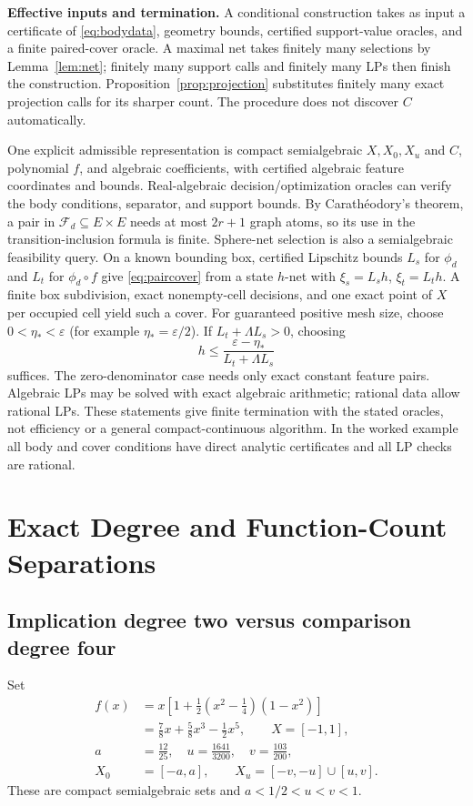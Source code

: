 \documentclass[journal,10pt]{IEEEtran}
\theoremstyle{definition}\newtheorem{definition}{Definition}
\theoremstyle{remark}
\newcommand{\F}{\mathcal F_d}
\begin{document}
\textbf{Effective inputs and termination.}
A conditional construction takes as input a certificate of \eqref{eq:bodydata}, geometry bounds, certified support-value oracles, and a finite paired-cover oracle. A maximal net takes finitely many selections by Lemma~\ref{lem:net}; finitely many support calls and finitely many LPs then finish the construction. Proposition~\ref{prop:projection} substitutes finitely many exact projection calls for its sharper count. The procedure does not discover $C$ automatically.

One explicit admissible representation is compact semialgebraic $X,X_0,X_u$ and $C$, polynomial $f$, and algebraic coefficients, with certified algebraic feature coordinates and bounds. Real-algebraic decision/optimization oracles can verify the body conditions, separator, and support bounds. By Carath\'eodory's theorem, a pair in $\F\subseteq E\times E$ needs at most $2r+1$ graph atoms, so its use in the transition-inclusion formula is finite. Sphere-net selection is also a semialgebraic feasibility query. On a known bounding box, certified Lipschitz bounds $L_s$ for $\phi_d$ and $L_t$ for $\phi_d\circ f$ give \eqref{eq:paircover} from a state $h$-net with $\xi_s=L_sh$, $\xi_t=L_th$. A finite box subdivision, exact nonempty-cell decisions, and one exact point of $X$ per occupied cell yield such a cover. For guaranteed positive mesh size, choose $0<\eta_*<\varepsilon$ (for example $\eta_*=\varepsilon/2$). If $L_t+\Lambda L_s>0$, choosing
\[
 h\leq\frac{\varepsilon-\eta_*}{L_t+\Lambda L_s}
\]
suffices. The zero-denominator case needs only exact constant feature pairs. Algebraic LPs may be solved with exact algebraic arithmetic; rational data allow rational LPs. These statements give finite termination with the stated oracles, not efficiency or a general compact-continuous algorithm. In the worked example all body and cover conditions have direct analytic certificates and all LP checks are rational.


\section{Exact Degree and Function-Count Separations}\label{sec:separations}
\subsection{Implication degree two versus comparison degree four}\label{sec:gap}
Set
\begin{align*}
 f(x)&=x\left[1+\tfrac12(x^2-\tfrac14)(1-x^2)\right]\\
 &=\tfrac78x+\tfrac58x^3-\tfrac12x^5,\qquad X=[-1,1],\\
 a&=\tfrac{12}{25},\quad u=\tfrac{1641}{3200},\quad v=\tfrac{103}{200},\\
 X_0&=[-a,a],\qquad X_u=[-v,-u]\cup[u,v].
\end{align*}
These are compact semialgebraic sets and $a<1/2<u<v<1$.
\end{document}
